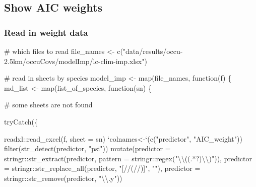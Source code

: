 \documentclass[]{article}
\newenvironment{Shaded}{}{}
\newcommand{\CharTok}[1]{\textcolor[rgb]{0.00,0.50,0.50}{#1}}
\newcommand{\CommentTok}[1]{\textcolor[rgb]{0.00,0.50,0.00}{#1}}
\newcommand{\ControlFlowTok}[1]{\textcolor[rgb]{0.00,0.00,1.00}{#1}}
\newcommand{\DataTypeTok}[1]{#1}
\newcommand{\KeywordTok}[1]{\textcolor[rgb]{0.00,0.00,1.00}{#1}}
\newcommand{\NormalTok}[1]{#1}
\newcommand{\OperatorTok}[1]{#1}
\newcommand{\StringTok}[1]{\textcolor[rgb]{0.00,0.50,0.50}{#1}}
\begin{document}
\hypertarget{show-aic-weights}{%
\subsection{Show AIC weights}\label{show-aic-weights}}

\hypertarget{read-in-weight-data}{%
\subsubsection{Read in weight data}\label{read-in-weight-data}}

\begin{Shaded}
\begin{Highlighting}[]
\CommentTok{# which files to read}
\NormalTok{file_names <-}\StringTok{ }\KeywordTok{c}\NormalTok{(}\StringTok{"data/results/occu-2.5km/occuCovs/modelImp/lc-clim-imp.xlsx"}\NormalTok{)}

\CommentTok{# read in sheets by species}
\NormalTok{model_imp <-}\StringTok{ }\KeywordTok{map}\NormalTok{(file_names, }\ControlFlowTok{function}\NormalTok{(f) \{}
\NormalTok{  md_list <-}\StringTok{ }\KeywordTok{map}\NormalTok{(list_of_species, }\ControlFlowTok{function}\NormalTok{(sn) \{}
    
    \CommentTok{# some sheets are not found}
    
    \KeywordTok{tryCatch}\NormalTok{(\{}
      
\NormalTok{      readxl}\OperatorTok{::}\KeywordTok{read_excel}\NormalTok{(f, }\DataTypeTok{sheet =}\NormalTok{ sn) }\OperatorTok{%
\StringTok{        `}\DataTypeTok{colnames<-}\StringTok{`}\NormalTok{(}\KeywordTok{c}\NormalTok{(}\StringTok{"predictor"}\NormalTok{, }\StringTok{"AIC_weight"}\NormalTok{)) }\OperatorTok{%
\StringTok{        }\KeywordTok{filter}\NormalTok{(}\KeywordTok{str_detect}\NormalTok{(predictor, }\StringTok{"psi"}\NormalTok{)) }\OperatorTok{%
\StringTok{        }\KeywordTok{mutate}\NormalTok{(}\DataTypeTok{predictor =}\NormalTok{ stringr}\OperatorTok{::}\KeywordTok{str_extract}\NormalTok{(predictor, }
                                \DataTypeTok{pattern =}\NormalTok{ stringr}\OperatorTok{::}\KeywordTok{regex}\NormalTok{(}\StringTok{"}\CharTok{\textbackslash{}\textbackslash{}}\StringTok{((.*?)}\CharTok{\textbackslash{}\textbackslash{}}\StringTok{)"}\NormalTok{)),}
               \DataTypeTok{predictor =}\NormalTok{ stringr}\OperatorTok{::}\KeywordTok{str_replace_all}\NormalTok{(predictor, }\StringTok{"[//(//)]"}\NormalTok{, }\StringTok{""}\NormalTok{),}
               \DataTypeTok{predictor =}\NormalTok{ stringr}\OperatorTok{::}\KeywordTok{str_remove}\NormalTok{(predictor, }\StringTok{"}\CharTok{\textbackslash{}\textbackslash{}}\StringTok{.y"}\NormalTok{))}
      
}}}
\end{Highlighting}
\end{Shaded}
\end{document}
